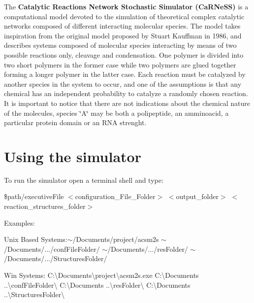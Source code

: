

 The {\bfseries Catalytic Reactions Network Stochastic Simulator (Ca\-R\-Ne\-S\-S)} is a computational model devoted to the simulation of theoretical complex catalytic networks composed of different interacting molecular species. The model takes inspiration from the original model proposed by Stuart Kauffman in 1986, and describes systems composed of molecular species interacting by means of two possible reactions only, cleavage and condensation. One polymer is divided into two short polymers in the former case while two polymers are glued together forming a longer polymer in the latter case. Each reaction must be catalyzed by another species in the system to occur, and one of the assumptions is that any chemical has an independent probability to catalyze a randomly chosen reaction. It is important to notice that there are not indications about the chemical nature of the molecules, species \char`\"{}\-A\char`\"{} may be both a polipeptide, an amminoacid, a particular protein domain or an R\-N\-A strenght.\par
\par
 \hypertarget{intro_secUsage}{}\section{Using the simulator}\label{intro_secUsage}
To run the simulator open a terminal shell and type\-:\par
\par
 {\ttfamily } \$path/executive\-File {\ttfamily } $<$configuration\-\_\-\-File\-\_\-\-Folder$>$ {\ttfamily } $<$output\-\_\-folder$>$ {\ttfamily } $<$reaction\-\_\-structures\-\_\-folder$>$\par
 Examples\-:
\begin{DoxyItemize}
\item Unix Based Systems\-:{\ttfamily $\sim$/\-Documents/project/acsm2s} {\ttfamily $\sim$/\-Documents/}.../conf\-File\-Folder/ {\ttfamily $\sim$/\-Documents/}.../res\-Folder/ {\ttfamily $\sim$/\-Documents/}.../\-Structures\-Folder/
\item Win Systems\-: {\ttfamily C\-:\textbackslash{}Documents\textbackslash{}project\textbackslash{}acsm2s.\-exe} {\ttfamily C\-:\textbackslash{}Documents} ..\textbackslash{}conf\-File\-Folder\textbackslash{} {\ttfamily C\-:\textbackslash{}Documents} ..\textbackslash{}res\-Folder\textbackslash{} {\ttfamily C\-:\textbackslash{}Documents} ..\textbackslash{}Structures\-Folder\textbackslash{}
\end{DoxyItemize}

